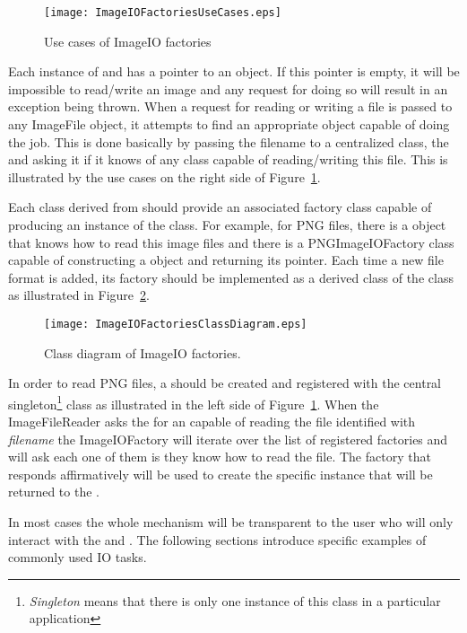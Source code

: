 \begin{figure}
\center
\texttt{[image: ImageIOFactoriesUseCases.eps]}
\caption{Use cases of ImageIO factories}
\label{fig:ImageIOFactoriesUseCases}
\end{figure}


Each instance of  and 
has a pointer to an  object. If this pointer is empty, it will be
impossible to read/write an image and any request for doing so will result in
an exception being thrown. When a request for reading or writing a file is
passed to any ImageFile object, it attempts to find an appropriate
 object capable of doing the job. This is done basically by
passing the filename to a centralized class, the  and
asking it if it knows of any  class capable of reading/writing
this file. This is illustrated by the use cases on the right side of
Figure~\ref{fig:ImageIOFactoriesUseCases}.

Each class derived from  should provide an associated
factory class capable of producing an instance of the  class. For
example, for PNG files, there is a  object that knows how
to read this image files and there is a PNGImageIOFactory class capable of
constructing a  object and returning its pointer. Each time a
new file format is added, its factory should be implemented as a derived class
of the  class as illustrated in
Figure~\ref{fig:ImageIOFactoriesClassDiagram}. 

\begin{figure}
\center
\texttt{[image: ImageIOFactoriesClassDiagram.eps]}
\caption{Class diagram of ImageIO factories.}
\label{fig:ImageIOFactoriesClassDiagram}
\end{figure}

In order to read PNG files, a  should be created and
registered with the central 
singleton\footnote{\emph{Singleton} means that there is only one instance of
this class in a particular application} class as illustrated in the left side
of Figure~\ref{fig:ImageIOFactoriesUseCases}. When the ImageFileReader asks the
 for an  capable of reading the file
identified with \emph{filename} the ImageIOFactory will iterate over the list
of registered factories and will ask each one of them is they know how to read
the file. The factory that responds affirmatively will be used to create the
specific  instance that will be returned to the .

In most cases the whole mechanism will be transparent to the user who will only
interact with the  and . The following
sections introduce specific examples of commonly used IO tasks. 







